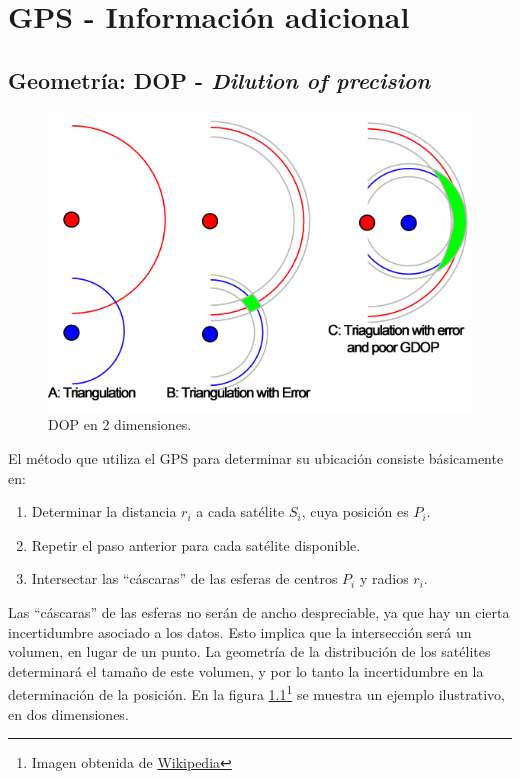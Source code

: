 
%


\chapter{GPS - Información adicional}
\label{chap:gps-extra}

\section{Geometría: DOP - \textit{Dilution of precision}}
\label{sec:dop}

\begin{figure}
\vspace{-30pt}
  \begin{center}
    \includegraphics[width=.5\textwidth]{./pics_gps/dop.png}
  \end{center}
\vspace{-20pt}
  \caption{DOP en 2 dimensiones.}
\vspace{-50pt}
\label{fig:dop.png}
\end{figure}

El método que utiliza el GPS para determinar su ubicación consiste básicamente en:
\begin{enumerate}
\item Determinar la distancia $r_i$ a cada satélite $S_i$, cuya posición es $P_i$.
\item Repetir el paso anterior para cada satélite disponible.
\item Intersectar las ``cáscaras'' de las esferas de centros $P_i$ y radios $r_i$.
\end{enumerate}

Las ``cáscaras'' de las esferas no serán de ancho despreciable, ya que hay un cierta incertidumbre asociado a los datos. Esto implica que la intersección será un volumen, en lugar de un punto. La geometría de la distribución de los satélites determinará el tamaño de este volumen, y por lo tanto la incertidumbre en la determinación de la posición. En la figura \ref{fig:dop.png}\footnote{Imagen obtenida de \href{http://en.wikipedia.org/wiki/Dilution\_of\_precision\_(GPS)}{Wikipedia}} se muestra un ejemplo ilustrativo, en dos dimensiones.

